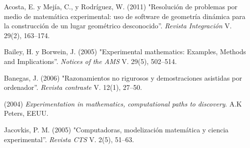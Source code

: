 \begin{titlepage}
\begin{minipage}{0.85\linewidth}
\end{minipage}
\vspace{5pt}
\begin{thebibliography}{99}
 {\sc Acosta, E. y Mej\'ia, C., y Rodr\'iguez, W.} (2011) "Resoluci\'on de problemas por medio	de matem\'atica experimental: uso de software de geometr\'ia	din\'amica para la construcci\'on de un lugar geom\'etrico desconocido''. \emph{Revista Integraci\'on} V. 29(2), 163--174.

 {\sc Bailey, H. y Borwein, J.} (2005) "Experimental mathematics: Examples, Methods and	 Implications''. \emph{Notices of the AMS} V. 29(5), 502--514.

 {\sc Banegas, J.} (2006) "Razonamientos no rigurosos y demostraciones asistidas por
	ordenador''. \emph{Revista contraste} V. 12(1), 27--50.

 (2004) {\it Experimentation in mathematics, computational paths to
	discovery}.  A.K Peters, EEUU.

 {\sc Jacovkis, P. M.} (2005) "Computadoras, modelizaci\'on matem\'atica y ciencia experimental''. \emph{Revista CTS} V. 2(5), 51--63.

\end{thebibliography}
\end{titlepage}
